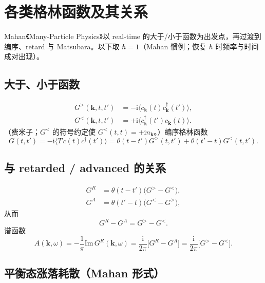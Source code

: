 \section{各类格林函数及其关系}

Mahan《Many-Particle Physics》以 real-time 的大于/小于函数为出发点，再过渡到编序、retard 与 Matsubara。以下取 $\hbar=1$（Mahan 惯例；恢复 $\hbar$ 时频率与时间成对出现）。

\subsection{大于、小于函数}

\begin{equation}
\begin{aligned}
  G^>(\mathbf{k},t,t')
  &=-\mathrm{i}\bigl\langle c_{\mathbf{k}}(t)c_{\mathbf{k}}^\dagger(t')\bigr\rangle,\\
  G^<(\mathbf{k},t,t')
  &=+\mathrm{i}\bigl\langle c_{\mathbf{k}}^\dagger(t')c_{\mathbf{k}}(t)\bigr\rangle.
\end{aligned}
\label{eq:Ggl}
\end{equation}
（费米子；$G^<$ 的符号约定使 $G^<(t,t)=+\mathrm{i}n_{\mathbf{k}}$。）编序格林函数
\begin{equation}
  G(t,t')
  =-\mathrm{i}\bigl\langle T\,c(t)c^\dagger(t')\bigr\rangle
  =\theta(t-t')G^>(t,t')+\theta(t'-t)G^<(t,t').
\end{equation}

\subsection{与 retarded / advanced 的关系}

\begin{equation}
\begin{aligned}
  G^R&= \theta(t-t')\bigl(G^>-G^<\bigr),\\
  G^A&= \theta(t'-t)\bigl(G^<-G^>\bigr),
\end{aligned}
\end{equation}
从而
\begin{equation}
  G^R-G^A=G^>-G^<.
\end{equation}
谱函数
\begin{equation}
  A(\mathbf{k},\omega)
  =-\frac{1}{\pi}\mathrm{Im}\,G^R(\mathbf{k},\omega)
  =\frac{\mathrm{i}}{2\pi}\bigl[G^R-G^A\bigr]
  =\frac{\mathrm{i}}{2\pi}\bigl[G^>-G^<\bigr].
\label{eq:A_from_G}
\end{equation}

\subsection{平衡态涨落耗散（Mahan 形式）}

